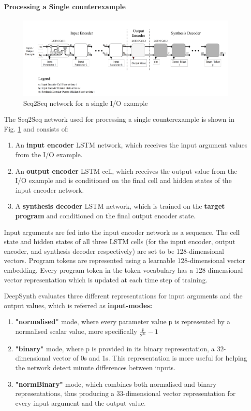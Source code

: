 \paragraph{Processing a Single counterexample}
\begin{figure}
    \centering
    \includegraphics[scale=0.5]{dsnn2.png}
    \caption{Seq2Seq network for a single I/O example}
    \label{fig:dsnn2}
\end{figure}
The Seq2Seq network used for processing a single counterexample is shown in Fig. \ref{fig:dsnn2} and consists of:
\begin{enumerate}
    \item An \textbf{input encoder} LSTM network, which receives the input argument values from the I/O example.
    \item An \textbf{output encoder} LSTM cell, which receives the output value from the I/O example and is conditioned on the final cell and hidden states of the input encoder network.
    \item A \textbf{synthesis decoder} LSTM network, which is trained on the \textbf{target program} and conditioned on the final output encoder state.
\end{enumerate}
Input arguments are fed into the input encoder network as a sequence. The cell state and hidden states of all three LSTM cells (for the input encoder, output encoder, and synthesis decoder respectively) are set to be 128-dimensional vectors. Program tokens are represented using a learnable 128-dimensional vector embedding. Every program token in the token vocabulary has a 128-dimensional vector representation which is updated at each time step of training.

DeepSynth evaluates three different representations for input arguments and the output values, which is referred as \textbf{input-modes:}
\begin{enumerate}
    \item \textbf{"normalised"} mode, where every parameter value p is represented by a normalised scalar value, more specifically $\frac{p}{2^{31}} - 1$ \item \textbf{"binary"} mode, where p is provided in its binary representation, a 32-dimensional vector of 0s and 1s. This representation is more useful for helping the network detect minute differences between inputs.
    \item \textbf{"normBinary"} mode, which combines both normalised and binary representations, thus producing a 33-dimensional vector representation for every input argument and the output value.
\end{enumerate}

